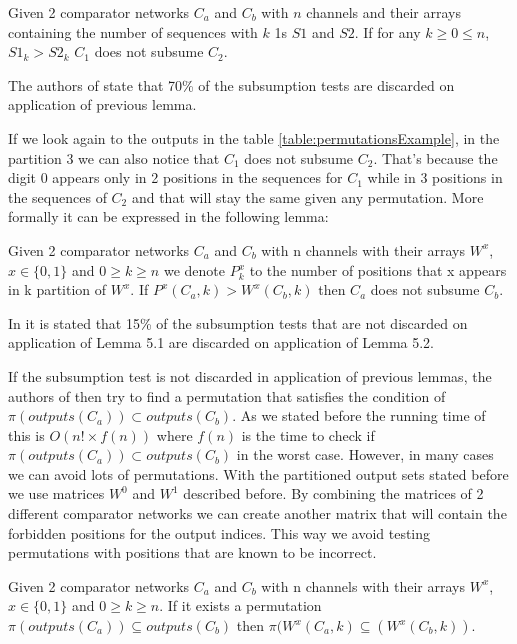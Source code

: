 \documentclass[../main.tex]{subfiles}
\begin{document}
	\begin{lemma}
		Given 2 comparator networks $C_a$ and $C_b$ with $n$ channels and their arrays containing the number of sequences with $k$ 1s $S1$ and $S2$. If for any $k\geq 0 \leq n$, $S1_k > S2_k$ $C_1$ does not subsume $C_2$.
	\end{lemma}
	
	The authors of \cite{sortingnineinputs} state that 70\% of the subsumption tests are discarded on application of previous lemma.
	
	If we look again to the outputs in the table \ref{table:permutationsExample}, in the partition 3 we can also notice that $C_1$ does not subsume $C_2$. That's because the digit 0 appears only in 2 positions in the sequences for $C_1$ while in 3 positions in the sequences of $C_2$ and that will stay the same given any permutation. More formally it can be expressed in the following lemma:
	
	\begin{lemma}
		Given 2 comparator networks $C_a$ and $C_b$ with n channels with their arrays $W^x$, $x \in \{0,1\}$ and $0\geq k \geq n$ we denote $P{^x_k}$ to the number of positions that x appears in k partition of $W^x$. If $P^x(C_a, k) > W^x(C_b, k)$ then $C_a$ does not subsume $C_b$.
	\end{lemma}
	
	In \cite{sortingnineinputs} it is stated that 15\% of the subsumption tests that are not discarded on application of Lemma 5.1 are discarded on application of Lemma 5.2.
	
	If the subsumption test is not discarded in application of previous lemmas, the authors of \cite{sortingnineinputs} then try to find a permutation that satisfies the condition of $\pi(outputs(C_a)) \subset outputs(C_b)$. As we stated before the running time of this is $O(n! \times f(n))$ where $f(n)$ is the time to check if $\pi(outputs(C_a)) \subset outputs(C_b)$ in the worst case. However, in many cases we can avoid lots of permutations. With the partitioned output sets stated before we use matrices $W^0$ and $W^1$ described before. By combining the matrices of 2 different comparator networks we can create another matrix that will contain the forbidden positions for the output indices. This way we avoid testing permutations with positions that are known to be incorrect.
	
	\begin{lemma}
		Given 2 comparator networks $C_a$ and $C_b$ with n channels with their arrays $W^x$, $x \in \{0,1\}$ and $0\geq k \geq n$. If it exists a permutation $\pi(outputs(C_a)) \subseteq outputs(C_b)$ then $\pi(W^x(C_a, k) \subseteq (W^x(C_b, k))$.
	\end{lemma}
	
\end{document}
